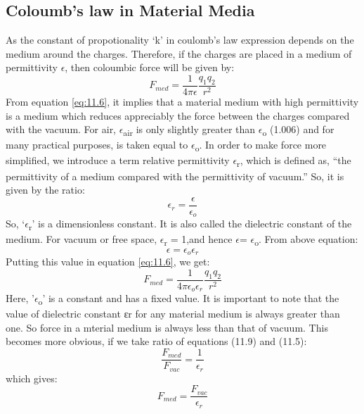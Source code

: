 \subsection{Coloumb’s law in Material Media}
As the constant of propotionality ‘k’ in coulomb’s law expression depends on the medium
around the charges. Therefore, if the charges are placed in a medium
of permittivity $\epsilon$, then coloumbic force will be given by:
\begin{equation}\label{eq:11.6}
  F_{med} = \frac{1}{4\pi\epsilon} \frac{q_{1}q_{2}}{r^{2}}
\end{equation}
From equation \ref{eq:11.6}, it implies that a material medium
with high permittivity is a medium which reduces appreciably
the force between the charges compared with the vacuum. For air, $\epsilon$\textsubscript{air}
is only slightly greater than $\epsilon$\textsubscript{o} (1.006) and for many practical purposes,
is taken equal to $\epsilon$\textsubscript{o}.
In order to make force more simplified, we introduce a term relative permittivity $\epsilon$\textsubscript{r},
which is defined as, “the permittivity of a medium compared with the permittivity of vacuum.” So,
it is given by the ratio:
\begin{equation}\label{eq:11.7}
  \epsilon_{r} = \frac{\epsilon}{\epsilon_{o}}
\end{equation}
So, ‘$\epsilon$\textsubscript{r}’ is a dimensionless constant.
It is also called the dielectric constant of the medium.
For vacuum or free space, $\epsilon$\textsubscript{r} = 1,and hence $\epsilon$= $\epsilon$\textsubscript{o}.
From above equation:
\begin{equation}\label{eq:11.8}
  \epsilon = \epsilon_{o}\epsilon_{r}
\end{equation}
Putting this value in equation \ref{eq:11.6}, we get:
\begin{equation}\label{eq:11.9}
  F_{med} = \frac{1}{4\pi\epsilon_{o}\epsilon_{r}} \frac{q_{1}q_{2}}{r^{2}}
\end{equation}
Here, '$\epsilon$\textsubscript{o}' is a constant and has a fixed value.
It is important to note that the value of dielectric constant εr for any material
medium is always greater than one. So force in a mterial medium
is always less than that of vacuum. This becomes more obvious,
if we take ratio of equations (11.9) and (11.5):
\begin{equation}\label{eq:11.10}
  \frac{F_{med}}{F_{vac}} = \frac{1}{\epsilon_{r}}
\end{equation}
which gives:
\begin{equation}\label{eq:11.11}
  F_{med} = \frac{F_{vac}}{\epsilon_{r}}
\end{equation}
